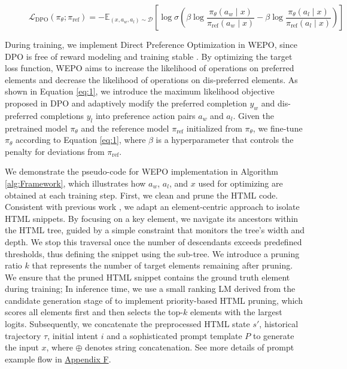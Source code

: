 \documentclass{article}
\begin{document}
      \begin{figure}[ht]
      \begin{equation}
        \label{eq:1}
        \mathcal{L}_{\mathrm{DPO}}\left(\pi_{\theta} ; \pi_{\mathrm{ref}}\right)=-\mathbb{E}_{\left(x, a_{w}, a_{l}\right) \sim \mathcal{D}}\left[\log \sigma\left(\beta \log \frac{\pi_{\theta}\left(a_{w} \mid x\right)}{\pi_{\mathrm{ref}}\left(a_{w} \mid x\right)}-\beta \log \frac{\pi_{\theta}\left(a_{l} \mid x\right)}{\pi_{\mathrm{ref}}\left(a_{l} \mid x\right)}\right)\right]
      \end{equation}
      \end{figure}
  
  During training, we implement Direct Preference Optimization in WEPO, since DPO is free of reward modeling and training stable \citep{rafailov2024direct}. By optimizing the target loss function, WEPO aims to increase the likelihood of operations on preferred elements and decrease the likelihood of operations on dis-preferred elements. As shown in Equation \ref{eq:1}, we introduce the maximum likelihood objective proposed in DPO and adaptively modify the preferred completion \( y_w \) and dis-preferred completions \( y_l \) into preference action pairs \( a_w \) and \( a_l \). Given the pretrained model \( \pi_{\theta} \) and the reference model \( \pi_{\mathrm{ref}} \) initialized from \( \pi_{\theta} \), we fine-tune \( \pi_{\theta} \) according to Equation \ref{eq:1}, where \( \beta \) is a hyperparameter that controls the penalty for deviations from \( \pi_{\mathrm{ref}} \).
  
  We demonstrate the pseudo-code for WEPO implementation in Algorithm \ref{alg:Framework}, which illustrates how \( a_w \), \( a_l \), and \( x \) used for optimizing are obtained at each training step. First, we clean and prune the HTML code. Consistent with previous work \citep{gur2023understanding, deng2024mind2web}, we adapt an element-centric approach to isolate HTML snippets. By focusing on a key element, we navigate its ancestors within the HTML tree, guided by a simple constraint that monitors the tree's width and depth. We stop this traversal once the number of descendants exceeds predefined thresholds, thus defining the snippet using the sub-tree. We introduce a pruning ratio \( k \) that represents the number of target elements remaining after pruning. We ensure that the pruned HTML snippet contains the ground truth element during training; In inference time, we use a small ranking LM derived from the candidate generation stage of \citet{deng2024mind2web} to implement priority-based HTML pruning, which scores all elements first and then selects the top-$k$ elements with the largest logits. Subsequently, we concatenate the preprocessed HTML state \( s' \), historical trajectory \( \tau \), initial intent \( i \) and a sophisticated prompt template \( P \) to generate the input \( x \), where \( \oplus \) denotes string concatenation. See more details of prompt example flow in \hyperref[sec:flow]{Appendix F}.
\end{document}
